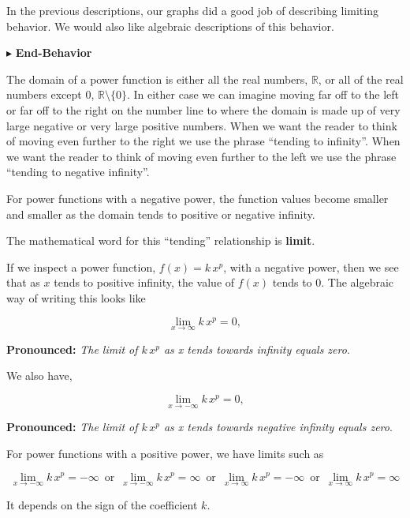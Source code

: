 \documentclass{ximera}
\begin{document}
In the previous descriptions, our graphs did a good job of describing limiting behavior.  We would also like algebraic descriptions of this behavior.


$\blacktriangleright$  \textbf{End-Behavior}

The domain of a power function is either all the real numbers, $\mathbb{R}$, or all of the real numbers except $0$, $\mathbb{R} \setminus \{ 0 \}$.  In either case we can imagine moving far off to the left or far off to the right on the number line to where the domain is made up of very large negative or very large positive numbers.  When we want the reader to think of moving even further to the right we use the phrase ``tending to infinity''. When we want the reader to think of moving even further to the left we use the phrase ``tending to negative infinity''.

For power functions with a negative power, the function values become smaller and smaller as the domain tends to positive or negative infinity.

The mathematical word for this ``tending'' relationship is \textbf{\textcolor{purple!85!blue}{limit}}.

If we inspect a power function, $f(x) = k \, x^p$, with a negative power, then we see that as $x$ tends to positive infinity, the value of $f(x)$ tends to $0$.  The algebraic way of writing this looks like


\[    \lim_{x \to \infty} k \, x^p = 0,        \]


\textbf{\textcolor{blue!55!black}{Pronounced:}} \textit{The limit of $k \, x^p$ as x tends towards infinity equals zero}.


We also have,

\[    \lim_{x \to -\infty} k \, x^p = 0,        \]


\textbf{\textcolor{blue!55!black}{Pronounced:}} \textit{The limit of $k \, x^p$ as x tends towards negative infinity equals zero}.


For power functions with a positive power, we have limits such as 



\[    \lim_{x \to -\infty} k \, x^p =  -\infty  \,   \text{ or }  \,  \lim_{x \to -\infty} k \, x^p =  \infty  \,   \text{ or }  \,     \lim_{x \to \infty} k \, x^p = -\infty  \,  \text{ or }  \,     \lim_{x \to \infty} k \, x^p = \infty  \]




It depends on the sign of the coefficient $k$.
\end{document}
